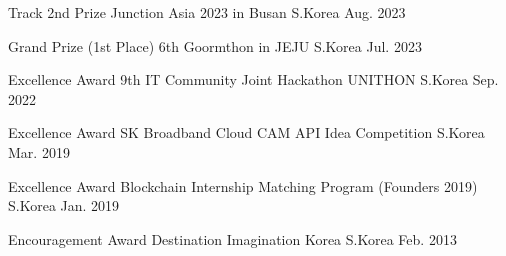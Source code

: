 



\begin{cvhonors}

\cvhonor
  {Track 2nd Prize} %
  {Junction Asia 2023 in Busan} %
  {S.Korea} %
  {Aug. 2023} %

\cvhonor
  {Grand Prize (1st Place)} %
  {6th Goormthon in JEJU} %
  {S.Korea} %
  {Jul. 2023} %

\cvhonor
  {Excellence Award} %
  {9th IT Community Joint Hackathon UNITHON} %
  {S.Korea} %
  {Sep. 2022} %

\cvhonor
  {Excellence Award} %
  {SK Broadband Cloud CAM API Idea Competition} %
  {S.Korea} %
  {Mar. 2019} %

\cvhonor
  {Excellence Award} %
  {Blockchain Internship Matching Program (Founders 2019)} %
  {S.Korea} %
  {Jan. 2019} %

\cvhonor
  {Encouragement Award} %
  {Destination Imagination Korea} %
  {S.Korea} %
  {Feb. 2013} %

\end{cvhonors}
